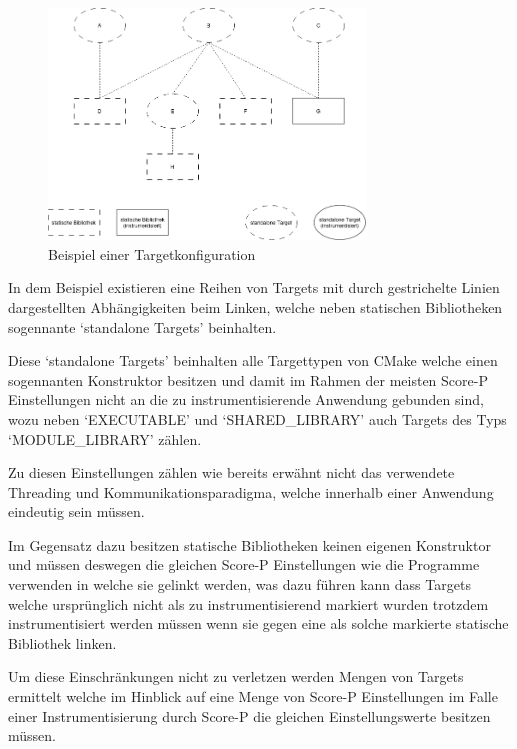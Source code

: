\documentclass[german,proseminar,hyperref,utf8]{zihpub}
\begin{document}
    \begin{figure}[ht]
        \begin{center}
            \includegraphics[width=0.75\textwidth]{analysis_before.drawio.png}
            \caption{Beispiel einer Targetkonfiguration}
            \label{fig:analysis_example}
        \end{center}
    \end{figure}

    In dem Beispiel existieren eine Reihen von Targets mit durch gestrichelte Linien dargestellten
    Abhängigkeiten beim Linken, welche neben statischen Bibliotheken sogennante `standalone Targets'
    beinhalten.

    Diese `standalone Targets' beinhalten alle Targettypen von CMake welche einen sogennanten
    Konstruktor besitzen und damit im Rahmen der meisten Score-P Einstellungen nicht an die
    zu instrumentisierende Anwendung gebunden sind, wozu neben `EXECUTABLE' und `SHARED\_LIBRARY'
    auch Targets des Typs `MODULE\_LIBRARY' zählen.

    Zu diesen Einstellungen zählen wie bereits erwähnt nicht das verwendete Threading und
    Kommunikationsparadigma, welche innerhalb einer Anwendung eindeutig sein müssen.

    Im Gegensatz dazu besitzen statische Bibliotheken keinen eigenen Konstruktor und müssen deswegen
    die gleichen Score-P Einstellungen wie die Programme verwenden in welche sie gelinkt werden, was
    dazu führen kann dass Targets welche ursprünglich nicht als zu instrumentisierend markiert wurden
    trotzdem instrumentisiert werden müssen wenn sie gegen eine als solche markierte statische
    Bibliothek linken.

    Um diese Einschränkungen nicht zu verletzen werden Mengen von Targets ermittelt welche im
    Hinblick auf eine Menge von Score-P Einstellungen im Falle einer Instrumentisierung durch
    Score-P die gleichen Einstellungswerte besitzen müssen.
\end{document}
